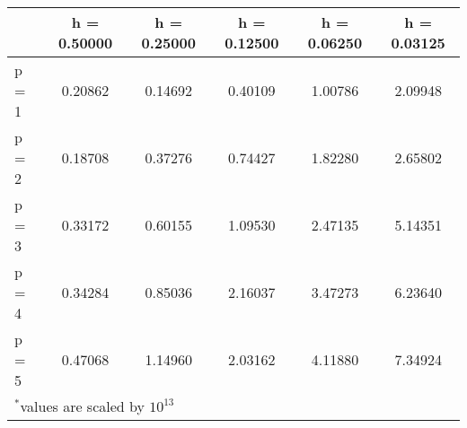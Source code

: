 \documentclass{standalone}
\begin{document}
\begin{tabular}{@{} l *{5}{c} @{}}
    \toprule
    & h = 0.50000 & h = 0.25000 & h = 0.12500 & h = 0.06250 & h = 0.03125 \\
    \midrule
    p = 1 & 0.20862 & 0.14692 & 0.40109 & 1.00786 & 2.09948 \\
    p = 2 & 0.18708 & 0.37276 & 0.74427 & 1.82280 & 2.65802 \\
    p = 3 & 0.33172 & 0.60155 & 1.09530 & 2.47135 & 5.14351 \\
    p = 4 & 0.34284 & 0.85036 & 2.16037 & 3.47273 & 6.23640 \\
    p = 5 & 0.47068 & 1.14960 & 2.03162 & 4.11880 & 7.34924 \\
    \midrule
    \multicolumn{6}{l}{\footnotesize $^*$values are scaled by $10^{13}$} \\
    \bottomrule
\end{tabular}
\end{document}
